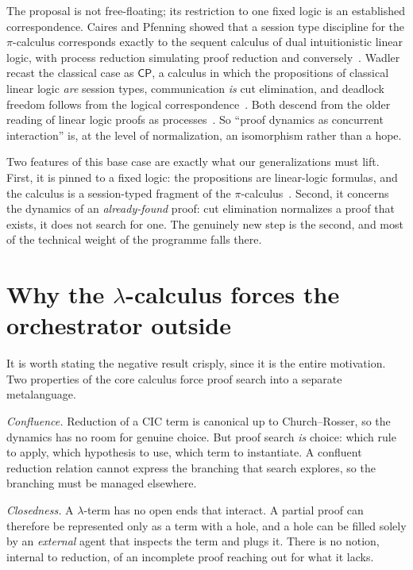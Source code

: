 \documentclass[11pt]{article}
\theoremstyle{plain}
\theoremstyle{definition}
\theoremstyle{remark}
\newcommand{\CP}{\textsf{CP}}
\begin{document}
The proposal is not free-floating; its restriction to one fixed logic is an
established correspondence. Caires and Pfenning showed that a session type
discipline for the $\pi$-calculus corresponds exactly to the sequent calculus
of dual intuitionistic linear logic, with process reduction simulating proof
reduction and conversely~\cite{cairespfenning}. Wadler recast the classical case
as $\CP$, a calculus in which the propositions of classical linear logic
\emph{are} session types, communication \emph{is} cut elimination, and
deadlock freedom follows from the logical correspondence~\cite{wadler}. Both
descend from the older reading of linear logic proofs as
processes~\cite{girard}. So ``proof dynamics as concurrent interaction'' is,
at the level of normalization, an isomorphism rather than a hope.

Two features of this base case are exactly what our generalizations must lift.
First, it is pinned to a fixed logic: the propositions are linear-logic
formulas, and the calculus is a session-typed fragment of the
$\pi$-calculus~\cite{milnerparrowwalker}. Second, it concerns the dynamics of an
\emph{already-found} proof: cut elimination normalizes a proof that exists, it
does not search for one. The genuinely new step is the second, and most of the
technical weight of the programme falls there.

\section{Why the \texorpdfstring{$\lambda$}{lambda}-calculus forces the orchestrator outside}

It is worth stating the negative result crisply, since it is the entire
motivation. Two properties of the core calculus force proof search into a
separate metalanguage.

\emph{Confluence.} Reduction of a CIC term is canonical up to Church--Rosser,
so the dynamics has no room for genuine choice. But proof search \emph{is}
choice: which rule to apply, which hypothesis to use, which term to instantiate.
A confluent reduction relation cannot express the branching that search
explores, so the branching must be managed elsewhere.

\emph{Closedness.} A $\lambda$-term has no open ends that interact. A partial
proof can therefore be represented only as a term with a hole, and a
hole can be filled solely by an \emph{external} agent that inspects the term and
plugs it. There is no notion, internal to reduction, of an incomplete proof
reaching out for what it lacks.
\end{document}
